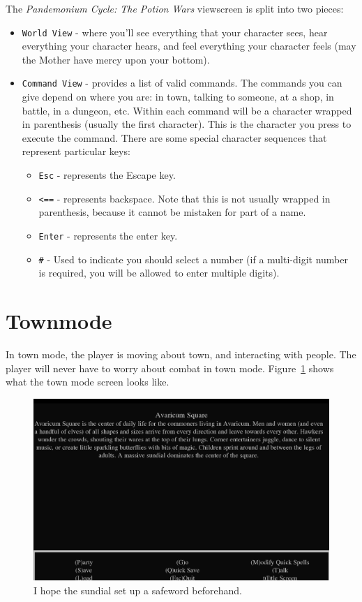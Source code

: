 \documentclass{report}
\begin{document}
The \textit{Pandemonium Cycle: The Potion Wars} viewscreen is split into two pieces:
\begin{itemize}
    \item \verb|World View| - where you'll see everything that your character sees, hear everything your character hears, and feel everything your character feels
    (may the Mother have mercy upon your bottom).
    \item \verb|Command View| - provides a list of valid commands. The commands you can give depend on where you are: in town, talking to someone,
    at a shop, in battle, in a dungeon, etc. Within each command will be a character wrapped in parenthesis (usually the first character). This is the character you press
    to execute the command. There are some special character sequences that represent particular keys:
        \begin{itemize}
            \item \verb|Esc| - represents the Escape key.
            \item {\color{green!50!black}\texttt{<==}} - represents backspace. Note that this is not usually wrapped in parenthesis, because it cannot be mistaken for part of 
            a name.
            \item \verb|Enter| - represents the enter key.
            \item \verb|#| - Used to indicate you should select a number (if a multi-digit number is required, you will be allowed to enter multiple digits).
        \end{itemize}
\end{itemize}

\section{Townmode}
\label{sec_townmode}
    In town mode, the player is moving about town, and interacting with people. The player will never have to worry about combat in town mode. Figure~\ref{fig_townmode}
    shows what the town mode screen looks like.

    \begin{figure}[h!]
        \includegraphics[width=\textwidth]{townmode}
        \caption{I hope the sundial set up a safeword beforehand.}
        \label{fig_townmode}
    \end{figure}
\end{document}
